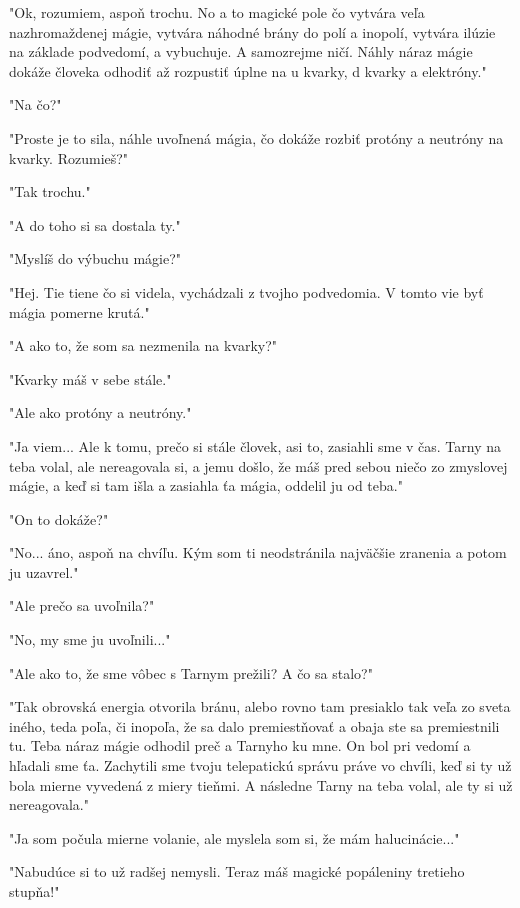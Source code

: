 \documentclass{book}
\begin{document}
"$ $Ok, rozumiem, aspoň trochu. No a to magické pole čo vytvára veľa nazhromaždenej mágie, vytvára náhodné brány do polí a inopolí, vytvára ilúzie na základe podvedomí, a vybuchuje. A samozrejme ničí. Náhly náraz mágie dokáže človeka odhodiť až rozpustiť úplne na u kvarky, d kvarky a elektróny."$ $ 

"$ $Na čo?"$ $ 

"$ $Proste je to sila, náhle uvoľnená mágia, čo dokáže rozbiť protóny a neutróny na kvarky. Rozumieš?"$ $ 

"$ $Tak trochu."$ $ 

"$ $A do toho si sa dostala ty."$ $ 

"$ $Myslíš do výbuchu mágie?"$ $ 

"$ $Hej. Tie tiene čo si videla, vychádzali z tvojho podvedomia. V tomto vie byť mágia pomerne krutá."$ $ 

"$ $A ako to, že som sa nezmenila na kvarky?"$ $ 

"$ $Kvarky máš v sebe stále."$ $ 

"$ $Ale ako protóny a neutróny."$ $ 

"$ $Ja viem... Ale k tomu, prečo si stále človek, asi to, zasiahli sme v čas. Tarny na teba volal, ale nereagovala si, a jemu došlo, že máš pred sebou niečo zo zmyslovej mágie, a keď si tam išla a zasiahla ťa mágia, oddelil ju od teba."$ $ 

"$ $On to dokáže?"$ $ 

"$ $No... áno, aspoň na chvíľu. Kým som ti neodstránila najväčšie zranenia a potom ju uzavrel."$ $ 

"$ $Ale prečo sa uvoľnila?"$ $ 

"$ $No, my sme ju uvoľnili..."$ $ 

"$ $Ale ako to, že sme vôbec s Tarnym prežili? A čo sa stalo?"$ $ 

"$ $Tak obrovská energia otvorila bránu, alebo rovno tam presiaklo tak veľa zo sveta iného, teda poľa, či inopoľa, že sa dalo premiestňovať a obaja ste sa premiestnili tu. Teba náraz mágie odhodil preč a Tarnyho ku mne. On bol pri vedomí a hľadali sme ťa. Zachytili sme tvoju telepatickú správu práve vo chvíli, keď si ty už bola mierne vyvedená z miery tieňmi. A následne Tarny na teba volal, ale ty si už nereagovala."$ $ 

"$ $Ja som počula mierne volanie, ale myslela som si, že mám halucinácie..."$ $ 

"$ $Nabudúce si to už radšej nemysli. Teraz máš magické popáleniny tretieho stupňa!"$ $ 
\end{document}
